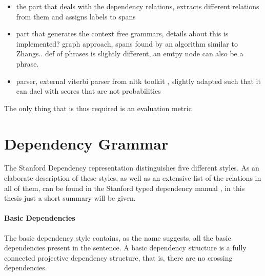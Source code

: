 \documentclass{report}
\theoremstyle{definition}
\theoremstyle{plain}
\begin{document}
\begin{itemize}
\item the part that deals with the dependency relations, extracts different relations from them and assigns labels to spans
\item part that generates the context free grammars, details about this is implemented? graph approach, spans found by an algorithm similar to Zhangs.. def of phrases is slightly different, an emtpy node can also be a phrase.
\item parser, external viterbi parser from nltk toolkit \citep{bird2009natural}, slightly adapted such that it can dael with scores that are not probabilities 
\end{itemize}

The only thing that is thus required is an evaluation metric





\section{Dependency Grammar}




The Stanford Dependency representation distinguishes five different styles. As an elaborate description of these styles, as well as an extensive list of the relations in all of them, can be found in the Stanford typed dependency manual \citep{de2008stanford}, in this thesis just a short summary will be given.
\paragraph{Basic Dependencies} The basic dependency style contains, as the name suggests, all the basic dependencies present in the sentence. A basic dependency structure is a fully connected projective dependency structure, that is, there are no crossing dependencies.
\end{document}
